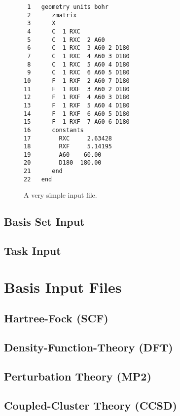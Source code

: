 \documentclass[letterpaper,12pt]{article}
\begin{document}
\begin{figure}
    \caption{A very simple input file.}
    \label{fig:HexafluorobenzeneZMatrix}
    \begin{verbatim}
 1   geometry units bohr
 2      zmatrix
 3      X
 4      C  1 RXC
 5      C  1 RXC  2 A60
 6      C  1 RXC  3 A60 2 D180
 7      C  1 RXC  4 A60 3 D180
 8      C  1 RXC  5 A60 4 D180
 9      C  1 RXC  6 A60 5 D180
10      F  1 RXF  2 A60 7 D180
11      F  1 RXF  3 A60 2 D180
12      F  1 RXF  4 A60 3 D180
13      F  1 RXF  5 A60 4 D180
14      F  1 RXF  6 A60 5 D180
15      F  1 RXF  7 A60 6 D180
16      constants
17        RXC     2.63428
18        RXF     5.14195
19        A60    60.00
20        D180  180.00
21      end
22   end
    \end{verbatim}
\end{figure}


\subsection{Basis Set Input}\label{sec:BasisSetInput}


\subsection{Task Input}\label{sec:TaskInput}


\section{Basis Input Files}\label{sec:BasisInputFiles}


\subsection{Hartree-Fock (SCF)}\label{sec:HartreeFock}


\subsection{Density-Function-Theory (DFT)}\label{sec:DensityFunctionTheory}


\subsection{Perturbation Theory (MP2)}\label{sec:PerturbationTheory}


\subsection{Coupled-Cluster Theory (CCSD)}\label{sec:CoupledClusterTheory}
\end{document}

